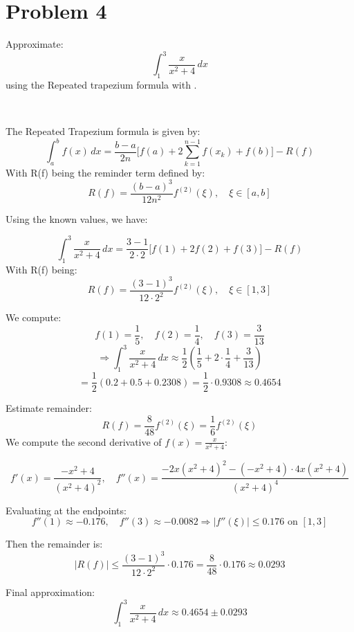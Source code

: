 \documentclass{article}
\begin{document}
\section*{Problem 4}
Approximate:
\[
    \int_{1}^{3} \frac{x}{x^2 + 4}  \, dx
\]
using the Repeated trapezium formula with .

\
\

The Repeated Trapezium formula is given by:
\[
    \int_{a}^{b} f(x) \, dx = \frac{b-a}{2n} \bigg[f(a) + 2\sum_{k=1}^{n-1}f(x_k) + f(b)\bigg] - R(f)
\]
With R(f) being the reminder term defined by:
\[
    R(f) = \frac{(b-a)^3}{12n^2}f^{(2)}(\xi), \quad \xi \in [a,b]
\]

Using the known values, we have:

\[
    \int_{1}^{3} \frac{x}{x^2 + 4}  \, dx = \frac{3-1}{2\cdot 2} \bigg[f(1) + 2f(2) + f(3)\bigg] - R(f)
\]
With R(f) being:
\[
    R(f) = \frac{(3-1)^3}{12\cdot 2^2}f^{(2)}(\xi), \quad \xi \in [1,3]
\]

We compute:
\[
f(1) = \frac{1}{5}, \quad f(2) = \frac{1}{4}, \quad f(3) = \frac{3}{13}
\]
\[
\Rightarrow \int_{1}^{3} \frac{x}{x^2 + 4}  \, dx \approx \frac{1}{2} \left( \frac{1}{5} + 2 \cdot \frac{1}{4} + \frac{3}{13} \right)
\]
\[
= \frac{1}{2} \left(0.2 + 0.5 + 0.2308\right) = \frac{1}{2} \cdot 0.9308 \approx 0.4654
\]

Estimate remainder:
\[
R(f) = \frac{8}{48} f^{(2)}(\xi) = \frac{1}{6} f^{(2)}(\xi)
\]
We compute the second derivative of \( f(x) = \frac{x}{x^2 + 4} \):

\[
f'(x) = \frac{-x^2 + 4}{(x^2 + 4)^2}, \quad
f''(x) = \frac{-2x(x^2 + 4)^2 - (-x^2 + 4)\cdot 4x(x^2 + 4)}{(x^2 + 4)^4}
\]

Evaluating at the endpoints:
\[
f''(1) \approx -0.176, \quad f''(3) \approx -0.0082
\Rightarrow |f''(\xi)| \leq 0.176 \text{ on } [1, 3]
\]

Then the remainder is:
\[
|R(f)| \leq \frac{(3 - 1)^3}{12 \cdot 2^2} \cdot 0.176 = \frac{8}{48} \cdot 0.176 \approx 0.0293
\]

Final approximation:
\[
    \boxed{\int_{1}^{3} \frac{x}{x^2 + 4} \, dx \approx 0.4654 \pm 0.0293}
\]
\end{document}
